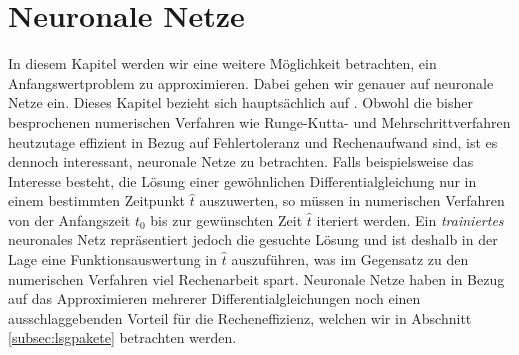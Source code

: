 \section{Neuronale Netze}
\label{sec:neuralnet}
In diesem Kapitel werden wir eine weitere Möglichkeit betrachten, ein Anfangswertproblem zu approximieren.
Dabei gehen wir genauer auf neuronale Netze ein. Dieses Kapitel bezieht sich hauptsächlich auf
\cite{calinDeepLearningArchitectures2020}. Obwohl die bisher besprochenen numerischen Verfahren wie Runge-Kutta- und
Mehrschrittverfahren heutzutage effizient in Bezug auf Fehlertoleranz und Rechenaufwand sind, ist es dennoch interessant,
neuronale Netze zu betrachten. Falls beispielsweise das Interesse besteht, die Lösung einer gewöhnlichen
Differentialgleichung nur in einem bestimmten Zeitpunkt $\hat{t}$ auszuwerten, so müssen in numerischen Verfahren von
der Anfangszeit $t_0$ bis zur gewünschten Zeit $\hat{t}$ iteriert werden. Ein \textit{trainiertes} neuronales Netz
repräsentiert jedoch die gesuchte Lösung und ist deshalb in der Lage eine Funktionsauswertung in $\hat{t}$ auszuführen,
was im Gegensatz zu den numerischen Verfahren viel Rechenarbeit spart. Neuronale Netze haben in Bezug auf das
Approximieren mehrerer Differentialgleichungen noch einen ausschlaggebenden Vorteil für die Recheneffizienz, welchen
wir in Abschnitt \ref{subsec:lsgpakete} betrachten werden.

